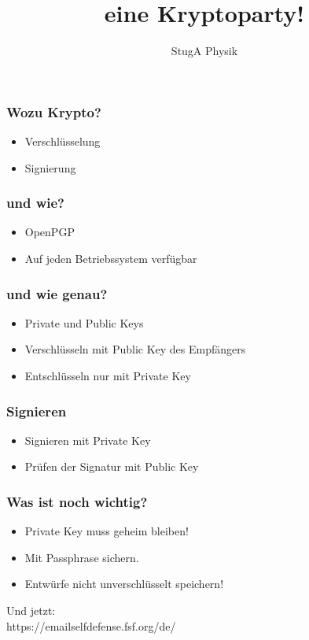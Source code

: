 \documentclass[14pt]{beamer}
\author{StugA Physik}
\title[Kryptoparty]{eine Kryptoparty!}
\begin{document}
\begin{frame}
    \titlepage
\end{frame}


\begin{frame}
    \frametitle{Wozu Krypto?}
    \begin{itemize}
        \item Verschlüsselung
        \item Signierung
    \end{itemize}

\end{frame}

\begin{frame}
    \frametitle{und wie?}
    \begin{itemize}
        \item OpenPGP
        \item Auf jeden Betriebssystem verfügbar
    \end{itemize}

\end{frame}

\begin{frame}
    \frametitle{und wie genau?}
    \begin{itemize}
        \item Private und Public Keys
        \item Verschlüsseln mit Public Key des Empfängers
        \item Entschlüsseln nur mit Private Key
    \end{itemize}

\end{frame}

\begin{frame}
    \frametitle{Signieren}
    \begin{itemize}
        \item Signieren mit Private Key
        \item Prüfen der Signatur mit Public Key
    \end{itemize}

\end{frame}

\begin{frame}
    \frametitle{Was ist noch wichtig?}
    \begin{itemize}
        \item Private Key muss geheim bleiben!
        \item Mit Passphrase sichern.
        \item Entwürfe nicht unverschlüsselt speichern!
    \end{itemize}

\end{frame}

\begin{frame}
    Und jetzt:\\
    \Large{https://emailselfdefense.fsf.org/de/}
\end{frame}
\end{document}
